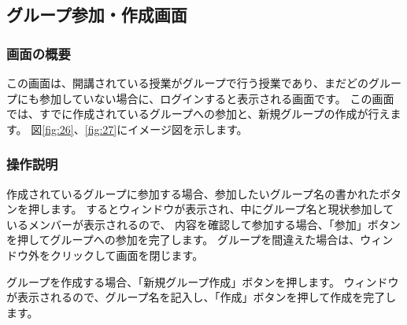 \newpage

\subsection{グループ参加・作成画面}
\subsubsection{画面の概要}
この画面は、開講されている授業がグループで行う授業であり、まだどのグループにも参加していない場合に、ログインすると表示される画面です。
この画面では、すでに作成されているグループへの参加と、新規グループの作成が行えます。
図\ref{fig:26}、\ref{fig:27}にイメージ図を示します。

\subsubsection{操作説明}

作成されているグループに参加する場合、参加したいグループ名の書かれたボタンを押します。
するとウィンドウが表示され、中にグループ名と現状参加しているメンバーが表示されるので、
内容を確認して参加する場合、「参加」ボタンを押してグループへの参加を完了します。
グループを間違えた場合は、ウィンドウ外をクリックして画面を閉じます。

グループを作成する場合、「新規グループ作成」ボタンを押します。
ウィンドウが表示されるので、グループ名を記入し、「作成」ボタンを押して作成を完了します。



